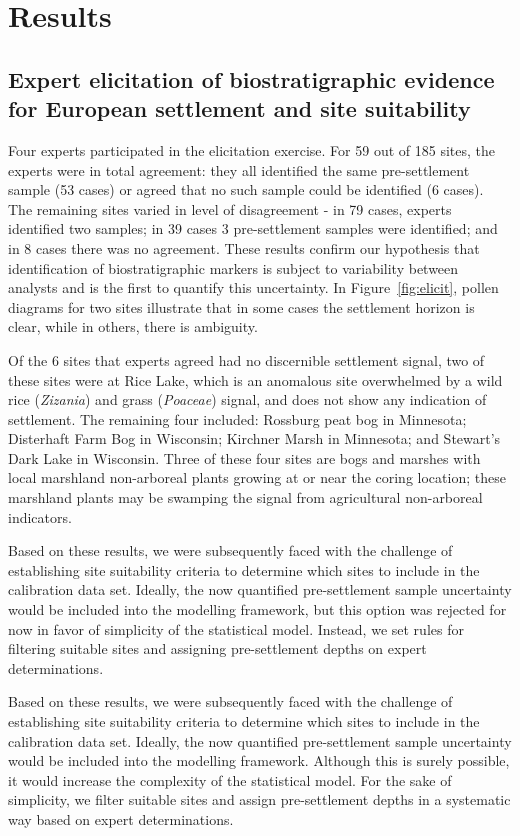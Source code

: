 \documentclass[12pt]{article}
\begin{document}
\section{Results}

\subsection{Expert elicitation of biostratigraphic evidence for European settlement and site suitability}

Four experts participated in the elicitation exercise. For 59 out of
185 sites, the experts were in total agreement: they all identified
the same pre-settlement sample (53 cases) or agreed that no such
sample could be identified (6 cases). The remaining sites varied in
level of disagreement - in 79 cases, experts identified two samples;
in 39 cases 3 pre-settlement samples were identified; and in 8 cases
there was no agreement. These results confirm our hypothesis that
identification of biostratigraphic markers is subject to variability
between analysts and is the first to quantify this uncertainty. In
Figure~\ref{fig:elicit}, pollen diagrams for two sites illustrate that
in some cases the settlement horizon is clear, while in others, there
is ambiguity.

Of the 6 sites that experts agreed had no discernible settlement
signal, two of these sites were at Rice Lake, which is an anomalous
site overwhelmed by a wild rice (\textit{Zizania}) and grass
(\textit{Poaceae}) signal, and does not show any indication of
settlement. The remaining four included: Rossburg peat bog in
Minnesota; Disterhaft Farm Bog in Wisconsin; Kirchner Marsh in
Minnesota; and Stewart’s Dark Lake in Wisconsin. Three of these four
sites are bogs and marshes with local marshland non-arboreal plants
growing at or near the coring location; these marshland plants may be
swamping the signal from agricultural non-arboreal indicators.

Based on these results, we were subsequently faced with the challenge
of establishing site suitability criteria to determine which sites to
include in the calibration data set. Ideally, the now quantified
pre-settlement sample uncertainty would be included into the modelling
framework, but this option was rejected for now in favor of simplicity
of the statistical model. Instead, we set rules for filtering suitable
sites and assigning pre-settlement depths on expert determinations.

Based on these results, we were subsequently faced with the challenge
of establishing site suitability criteria to determine which sites to
include in the calibration data set. Ideally, the now quantified
pre-settlement sample uncertainty would be included into the modelling
framework. Although this is surely possible, it would increase the
complexity of the statistical model. For the sake of simplicity, we
filter suitable sites and assign pre-settlement depths in a systematic
way based on expert determinations.
\end{document}
